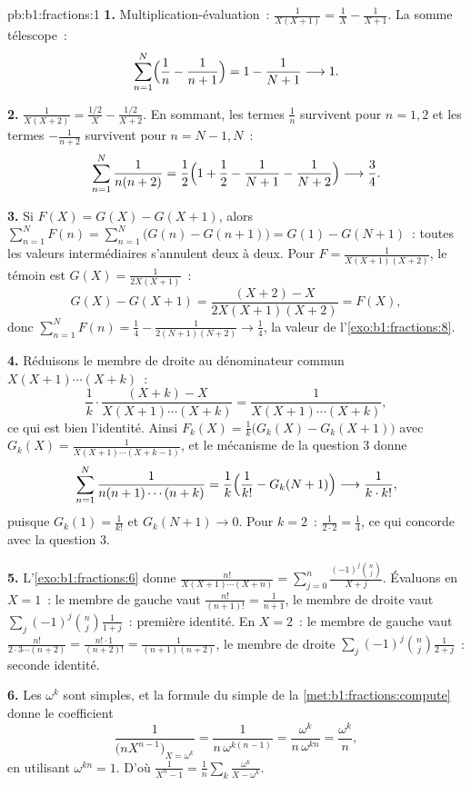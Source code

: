 \begin{solution}{pb:b1:fractions:1}
\textbf{1.} Multiplication-évaluation~: $\frac1{X(X+1)} = \frac1X -
\frac1{X+1}$. La somme télescope~:
\[
\sum_{n=1}^{N}\Bigl(\frac1n - \frac1{n+1}\Bigr)
= 1 - \frac1{N+1} \longrightarrow 1 .
\]

\textbf{2.} $\frac1{X(X+2)} = \frac{1/2}X - \frac{1/2}{X+2}$. En
sommant, les termes $\frac1n$ survivent pour $n = 1, 2$ et les termes
$-\frac1{n+2}$ survivent pour $n = N-1, N$~:
\[
\sum_{n=1}^{N}\frac1{n(n+2)}
= \frac12\Bigl(1 + \frac12 - \frac1{N+1} - \frac1{N+2}\Bigr)
\longrightarrow \frac34 .
\]

\textbf{3.} Si $F(X) = G(X) - G(X+1)$, alors $\sum_{n=1}^N F(n) =
\sum_{n=1}^N\bigl(G(n) - G(n+1)\bigr) = G(1) - G(N+1)$~: toutes les
valeurs intermédiaires s'annulent deux à deux. Pour $F =
\frac1{X(X+1)(X+2)}$, le témoin est $G(X) = \frac1{2X(X+1)}$~:
\[
G(X) - G(X+1)
= \frac{(X+2) - X}{2X(X+1)(X+2)} = F(X) ,
\]
donc $\sum_{n=1}^N F(n) = \frac14 - \frac1{2(N+1)(N+2)} \to
\frac14$, la valeur de l'\cref{exo:b1:fractions:8}.

\textbf{4.} Réduisons le membre de droite au dénominateur commun
$X(X+1)\cdots(X+k)$~:
\[
\frac1k\cdot\frac{(X + k) - X}{X(X+1)\cdots(X+k)}
= \frac{1}{X(X+1)\cdots(X+k)} ,
\]
ce qui est bien l'identité. Ainsi $F_k(X) = \frac1k\bigl(G_k(X) -
G_k(X+1)\bigr)$ avec $G_k(X) = \frac1{X(X+1)\cdots(X+k-1)}$, et le
mécanisme de la question 3 donne
\[
\sum_{n=1}^{N}\frac1{n(n+1)\cdots(n+k)}
= \frac1k\Bigl(\frac1{k!} - G_k(N+1)\Bigr)
\longrightarrow \frac1{k\cdot k!} ,
\]
puisque $G_k(1) = \frac1{k!}$ et $G_k(N+1) \to 0$. Pour $k = 2$~:
$\frac1{2\cdot2} = \frac14$, ce qui concorde avec la question 3.

\textbf{5.} L'\cref{exo:b1:fractions:6} donne
$\frac{n!}{X(X+1)\cdots(X+n)} = \sum_{j=0}^n
\frac{(-1)^j\binom nj}{X + j}$. Évaluons en $X = 1$~: le membre de
gauche vaut $\frac{n!}{(n+1)!} = \frac1{n+1}$, le membre de droite vaut
$\sum_j(-1)^j\binom nj\frac1{1+j}$~: première identité. En $X = 2$~: le
membre de gauche vaut $\frac{n!}{2\cdot3\cdots(n+2)} =
\frac{n!\cdot1}{(n+2)!} = \frac1{(n+1)(n+2)}$, le membre de droite
$\sum_j(-1)^j\binom nj\frac1{2+j}$~: seconde identité.

\textbf{6.} Les  $\omega^k$ sont simples, et la formule du 
simple de la \cref{met:b1:fractions:compute} donne le coefficient
\[
\frac{1}{\bigl(nX^{n-1}\bigr)_{X = \omega^k}}
= \frac{1}{n\,\omega^{k(n-1)}}
= \frac{\omega^k}{n\,\omega^{kn}} = \frac{\omega^k}n ,
\]
en utilisant $\omega^{kn} = 1$. D'où $\frac1{X^n-1} = \frac1n\sum_k
\frac{\omega^k}{X - \omega^k}$.


\end{solution}
